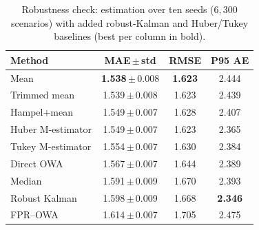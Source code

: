 \begin{table}[H]
\centering
\caption{Robustness check: estimation over ten seeds ($6{,}300$ scenarios)
with added robust-Kalman and Huber/Tukey baselines (best per column in bold).}
\label{tab:robust}
\footnotesize
\setlength{\tabcolsep}{6pt}
\begin{tabular}{lccc}
\toprule
\textbf{Method} & \textbf{MAE\,$\pm$\,std} & \textbf{RMSE} & \textbf{P95 AE} \\
\midrule
Mean              & \textbf{1.538}\,$\pm$\,0.008 & \textbf{1.623} & 2.444 \\
Trimmed mean      & 1.539\,$\pm$\,0.008 & 1.623 & 2.439 \\
Hampel$+$mean     & 1.549\,$\pm$\,0.007 & 1.628 & 2.407 \\
Huber M-estimator & 1.549\,$\pm$\,0.007 & 1.623 & 2.365 \\
Tukey M-estimator & 1.554\,$\pm$\,0.007 & 1.630 & 2.384 \\
Direct OWA        & 1.567\,$\pm$\,0.007 & 1.644 & 2.389 \\
Median            & 1.591\,$\pm$\,0.009 & 1.670 & 2.393 \\
Robust Kalman     & 1.598\,$\pm$\,0.009 & 1.668 & \textbf{2.346} \\
FPR--OWA          & 1.614\,$\pm$\,0.007 & 1.705 & 2.475 \\
\bottomrule
\end{tabular}
\end{table}
